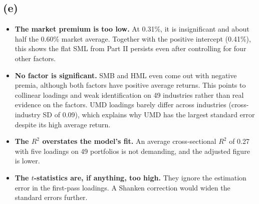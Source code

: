 \subsection*{(e)}
\begin{itemize}
  \item \textbf{The market premium is too low.} At 0.31\%, it is insignificant and about half the 0.60\% market average. Together with the positive intercept (0.41\%), this shows the flat SML from Part II persists even after controlling for four other factors.
  \item \textbf{No factor is significant.} SMB and HML even come out with negative premia, although both factors have positive average returns. This points to collinear loadings and weak identification on 49 industries rather than real evidence on the factors. UMD loadings barely differ across industries (cross-industry SD of 0.09), which explains why UMD has the largest standard error despite its high average return.
  \item \textbf{The $R^2$ overstates the model's fit.} An average cross-sectional $R^2$ of 0.27 with five loadings on 49 portfolios is not demanding, and the adjusted figure is lower.
  \item \textbf{The $t$-statistics are, if anything, too high.} They ignore the estimation error in the first-pass loadings. A Shanken correction would widen the standard errors further.
\end{itemize}
